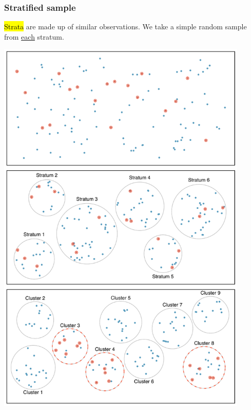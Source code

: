 \begin{frame}
\frametitle{Stratified sample}

\hl{Strata} are made up of similar observations. We take a simple random sample from \underline{each} stratum.

\begin{center}
\includegraphics[width=0.9\textwidth]{1-4_obs_studies_sampling/figures/sampling_methods/stratified}
\end{center}

\end{frame}


